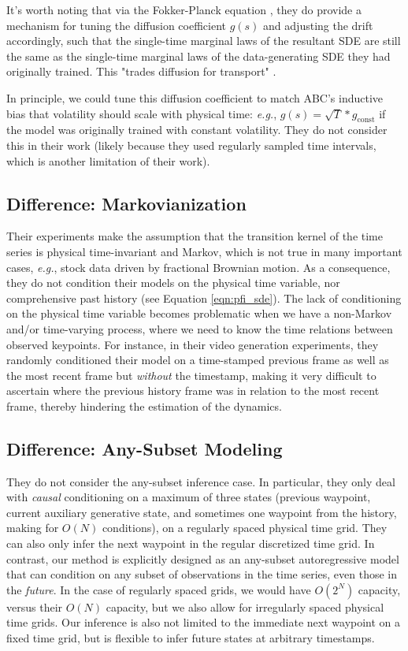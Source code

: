 \documentclass{article}
\begin{document}
It's worth noting that via the Fokker-Planck equation \cite{risken1989fokker}, they do provide a mechanism for tuning the diffusion coefficient $g(s)$ and adjusting the drift accordingly, such that the single-time marginal laws of the resultant SDE are still the same as the single-time marginal laws of the data-generating SDE they had originally trained. This "trades diffusion for transport" \cite{chen2024probabilistic}.

In principle, we could tune this diffusion coefficient to match ABC's inductive bias that volatility should scale with physical time: \textit{e.g.}, $g(s) = \sqrt{T} * g_\text{const}$ if the model was originally trained with constant volatility. They do not consider this in their work (likely because they used regularly sampled time intervals, which is another limitation of their work).

\subsection{Difference: Markovianization}

Their experiments make the assumption that the transition kernel of the time series is physical time-invariant and Markov, which is not true in many important cases, \textit{e.g.}, stock data driven by fractional Brownian motion. As a consequence, they do not condition their models on the physical time variable, nor comprehensive past history (see Equation \ref{eqn:pfi_sde}). The lack of conditioning on the physical time variable becomes problematic when we have a non-Markov and/or time-varying process, where we need to know the time relations between observed keypoints. For instance, in their video generation experiments, they randomly conditioned their model on a time-stamped previous frame as well as the most recent frame but \textit{without} the timestamp, making it very difficult to ascertain where the previous history frame was in relation to the most recent frame, thereby hindering the estimation of the dynamics.

\subsection{Difference: Any-Subset Modeling}

They do not consider the any-subset inference case. In particular, they only deal with \textit{causal} conditioning on a maximum of three states (previous waypoint, current auxiliary generative state, and sometimes one waypoint from the history, making for $O(N)$ conditions), on a regularly spaced physical time grid. They can also only infer the next waypoint in the regular discretized time grid. In contrast, our method is explicitly designed as an any-subset autoregressive model that can condition on any subset of observations in the time series, even those in the \textit{future}. In the case of regularly spaced grids, we would have $O(2^N)$ capacity, versus their $O(N)$ capacity, but we also allow for irregularly spaced physical time grids. Our inference is also not limited to the immediate next waypoint on a fixed time grid, but is flexible to infer future states at arbitrary timestamps.
\end{document}

